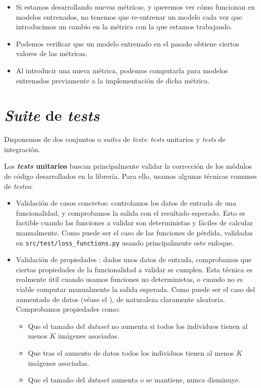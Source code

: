 \begin{itemize}
	\item Si estamos desarrollando nuevas métricas, y queremos ver cómo funcionan en modelos entrenados, no tenemos que re-entrenar un modelo cada vez que introducimos un cambio en la métrica con la que estamos trabajando.
	\item Podemos verificar que un modelo entrenado en el pasado obtiene ciertos valores de las métricas.
	\item Al introducir una nueva métrica, podemos computarla para modelos entrenados previamente a la implementación de dicha métrica.
\end{itemize}

\section{\textit{Suite} de \textit{tests}} \label{isec:test_suite}

Disponemos de dos conjuntos o \textit{suites} de \textit{tests}: \textit{tests} unitarios y \textit{tests} de integración.

Los \textbf{\textit{tests} unitarios} buscan principalmente validar la corrección de los módulos de código desarrollados en la librería. Para ello, usamos algunas técnicas comunes de \textit{testeo}:

\begin{itemize}
	\item Validación de casos concretos: controlamos los datos de entrada de una funcionalidad, y comprobamos la salida con el resultado esperado. Esto es factible cuando las funciones a validar son deterministas y fáciles de calcular manualmente. Como puede ser el caso de las funciones de pérdida, validadas en \lstinline{src/test/loss_functions.py} usando principalmente este enfoque.
	\item Validación de propiedades \cite{informatica:property_based_testing}: dados unos datos de entrada, comprobamos que ciertas propiedades de la funcionalidad a validar se cumplen. Esta técnica es realmente útil cuando usamos funciones no deterministas, o cuando no es viable computar manualmente la salida esperada. Como puede ser el caso del aumentado de datos (véase el ), de naturaleza claramente aleatoria. Comprobamos propiedades como:

	      \begin{itemize}
		      \item Que el tamaño del \textit{dataset} no aumenta si todos los individuos tienen al menos $K$ imágenes asociadas.
		      \item Que tras el aumento de datos todos los individuos tienen al menos $K$ imágenes asociadas.
		      \item Que el tamaño del \textit{dataset} aumenta o se mantiene, nunca disminuye.
	      \end{itemize}

\end{itemize}

